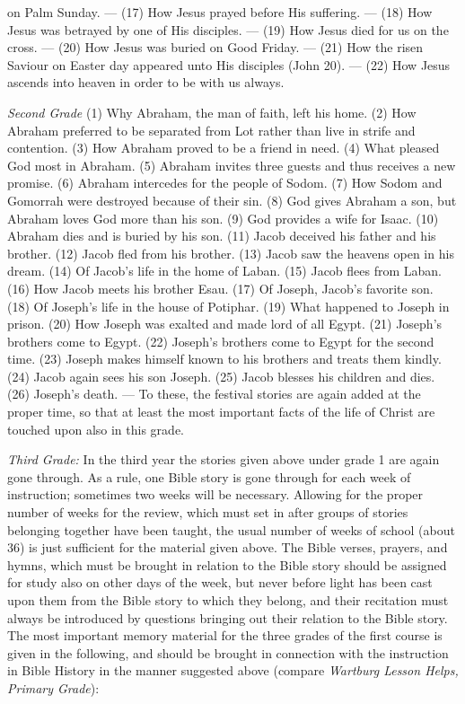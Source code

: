 on Palm Sunday. — (17) How Jesus prayed before His suffering. — (18) How Jesus was betrayed by one of His disciples. — (19) How Jesus died for us on the cross. — (20) How Jesus was buried on Good Friday. — (21) How the risen Saviour on Easter day appeared unto His disciples (John 20). — (22) How Jesus ascends into heaven in order to be with us always.

\emph{Second Grade} (1) Why Abraham, the man of faith, left his home. (2) How Abraham preferred to be separated from Lot rather than live in strife and contention. (3) How Abraham proved to be a friend in need. (4) What pleased God most in Abraham. (5) Abraham invites three guests and thus receives a new promise. (6) Abraham intercedes for the people of Sodom. (7) How Sodom and Gomorrah were destroyed because of their sin. (8) God gives Abraham a son, but Abraham loves God more than his son. (9) God provides a wife for Isaac. (10) Abraham dies and is buried by his son. (11) Jacob deceived his father and his brother. (12) Jacob fled from his brother. (13) Jacob saw the heavens open in his dream. (14) Of Jacob’s life in the home of Laban. (15) Jacob flees from Laban. (16) How Jacob meets his brother Esau. (17) Of Joseph, Jacob’s favorite son. (18) Of Joseph’s life in the house of Potiphar. (19) What happened to Joseph in prison. (20) How Joseph was exalted and made lord of all Egypt. (21) Joseph’s brothers come to Egypt. (22) Joseph’s brothers come to Egypt for the second time. (23) Joseph makes himself known to his brothers and treats them kindly. (24) Jacob again sees his son Joseph. (25) Jacob blesses his children and dies. (26) Joseph’s death. — To these, the festival stories are again added at the proper time, so that at least the most important facts of the life of Christ are touched upon also in this grade.

\emph{Third Grade:} In the third year the stories given above under grade 1 are again gone through. As a rule, one Bible story is gone through for each week of instruction; sometimes two weeks will be necessary. Allowing for the proper number of weeks for the review, which must set in after groups of stories belonging together have been taught, the usual number of weeks of school (about 36) is just sufficient for the material given above. The Bible verses, prayers, and hymns, which must be brought in relation to the Bible story should be assigned for study also on other days of the week, but never before light has been cast upon them from the Bible story to which they belong, and their recitation must always be introduced by questions bringing
out their relation to the Bible story. The most important memory material for the three grades of the first course is given in the following, and should be brought in connection with the instruction in Bible History in the manner suggested above (compare \emph{Wartburg Lesson Helps, Primary Grade}):

